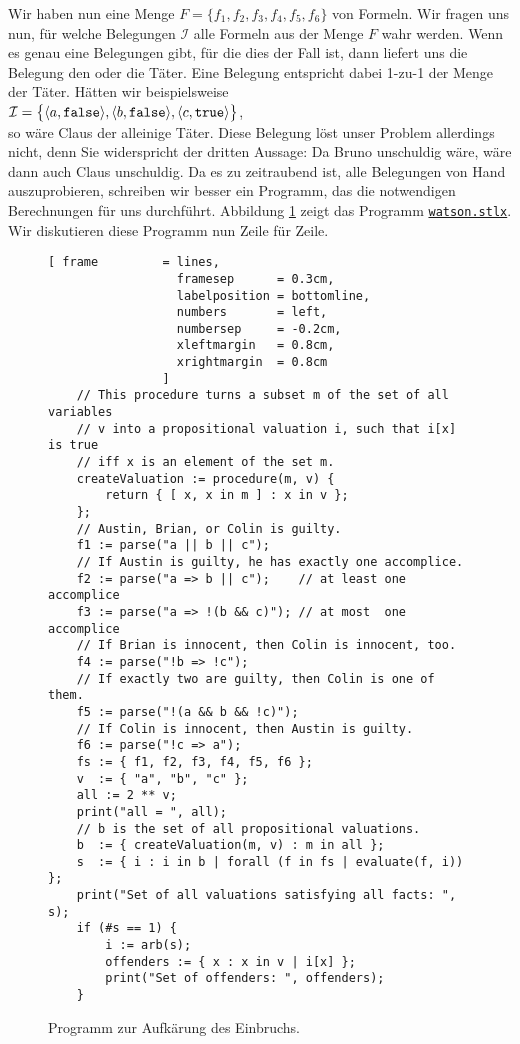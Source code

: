 Wir haben nun eine Menge $F = \{ f_1, f_2, f_3, f_4, f_5, f_6 \}$ von Formeln.
Wir fragen uns nun, f\"{u}r welche Belegungen $\mathcal{I}$ alle Formeln aus der Menge $F$ wahr werden.
Wenn es genau eine Belegungen gibt, f\"{u}r die dies der Fall ist, dann liefert uns die
Belegung den oder die T\"{a}ter.  Eine Belegung entspricht dabei 1-zu-1 der Menge der T\"{a}ter.
H\"{a}tten wir beispielsweise \\[0.2cm]
\hspace*{1.3cm} 
$\mathcal{I} = \bigl\{ \pair(a,\mathtt{false}), \pair(b,\mathtt{false}), \pair(c,\mathtt{true}) \bigr\}$,
\\[0.2cm]
so w\"{a}re Claus der alleinige T\"{a}ter.  Diese Belegung l\"{o}st unser Problem allerdings
nicht, denn Sie widerspricht der dritten Aussage: Da Bruno unschuldig w\"{a}re, w\"{a}re dann auch
Claus unschuldig.  Da es zu zeitraubend ist, alle Belegungen von Hand auszuprobieren,
schreiben wir besser ein Programm, das die notwendigen Berechnungen f\"{u}r uns durchf\"{u}hrt.
Abbildung \ref{fig:watson.stlx} zeigt das Programm
\href{https://github.com/karlstroetmann/Logik/blob/master/SetlX/watson.stlx}{\texttt{watson.stlx}}.
Wir diskutieren diese Programm nun Zeile f\"{u}r Zeile.

\begin{figure}[!ht]
  \centering
\begin{Verbatim}[ frame         = lines, 
                  framesep      = 0.3cm, 
                  labelposition = bottomline,
                  numbers       = left,
                  numbersep     = -0.2cm,
                  xleftmargin   = 0.8cm,
                  xrightmargin  = 0.8cm
                ]
    // This procedure turns a subset m of the set of all variables 
    // v into a propositional valuation i, such that i[x] is true 
    // iff x is an element of the set m.
    createValuation := procedure(m, v) {
        return { [ x, x in m ] : x in v };
    };
    // Austin, Brian, or Colin is guilty.
    f1 := parse("a || b || c");
    // If Austin is guilty, he has exactly one accomplice.
    f2 := parse("a => b || c");    // at least one accomplice
    f3 := parse("a => !(b && c)"); // at most  one accomplice
    // If Brian is innocent, then Colin is innocent, too.
    f4 := parse("!b => !c"); 
    // If exactly two are guilty, then Colin is one of them.
    f5 := parse("!(a && b && !c)"); 
    // If Colin is innocent, then Austin is guilty.
    f6 := parse("!c => a");
    fs := { f1, f2, f3, f4, f5, f6 };
    v  := { "a", "b", "c" };
    all := 2 ** v;
    print("all = ", all);
    // b is the set of all propositional valuations.
    b  := { createValuation(m, v) : m in all };
    s  := { i : i in b | forall (f in fs | evaluate(f, i)) };
    print("Set of all valuations satisfying all facts: ", s);
    if (#s == 1) {
        i := arb(s);
        offenders := { x : x in v | i[x] };
        print("Set of offenders: ", offenders);
    }
\end{Verbatim}
\vspace*{-0.3cm}
  \caption{Programm zur Aufk\"{a}rung des Einbruchs.}
  \label{fig:watson.stlx}
\end{figure}

